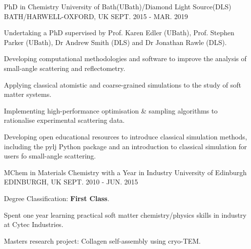 \begin{cventries}
  \cventry
    {PhD in Chemistry}
    {University of Bath(UBath)/Diamond Light Source(DLS)}
    {BATH/HARWELL-OXFORD, UK}
    {SEPT. 2015 - MAR. 2019}
    {
      \begin{cvitems}
        \item {Undertaking a PhD supervised by Prof. Karen Edler (UBath), Prof. Stephen Parker (UBath), Dr Andrew Smith (DLS) and Dr Jonathan Rawle (DLS).}
        \item {Developing computational methodologies and software to improve the analysis of small-angle scattering and reflectometry.}
        \item {Applying classical atomistic and coarse-grained simulations to the study of soft matter systems.}
        \item {Implementing high-performance optimisation \& sampling algorithms to rationalise experimental scattering data.}
        \item {Developing open educational resources to introduce classical simulation methods, including the pylj Python package and an introduction to classical simulation for users fo small-angle scattering.}
      \end{cvitems}
    }
  \cventry
    {MChem in Materials Chemistry with a Year in Industry}
    {University of Edinburgh}
    {EDINBURGH, UK}
    {SEPT. 2010 - JUN. 2015}
    {
      \begin{cvitems}
        \item {Degree Classification: \textbf{First Class}.}
        \item {Spent one year learning practical soft matter chemistry/physics skills in industry at Cytec Industries.}
        \item {Masters research project: Collagen self-assembly using cryo-TEM.}
      \end{cvitems}
    }
\end{cventries}
